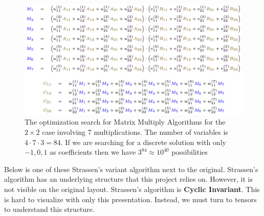 \documentclass[MS]{wfuthesis}
\begin{document}
                    \begin{figure}
                        \centering
                        \includegraphics[scale=0.75]{Figures/MatMulAlgSearch.png}
                        \caption{The optimization search for Matrix Multiply Algorithms for the $2 \times 2$ case involving 7 multiplications. The number of variables is $4 \cdot 7 \cdot 3 = 84$. If we are searching for a discrete solution with only $-1, 0, 1$ as coefficients then we have $3^{84} \approx 10^{40}$ possibilities}
                        \label{Opt}
                    \end{figure}

                    \newpage

                    Below is one of these Strassen's variant algorithm next to the original. Strassen's algorithm has an underlying structure that this project relies on. However, it is not visible on the original layout. Strassen's algorithm is \textbf{Cyclic Invariant}. This is hard to visualize with only this presentation. Instead, we must turn to tensors to understand this structure.
\end{document}
